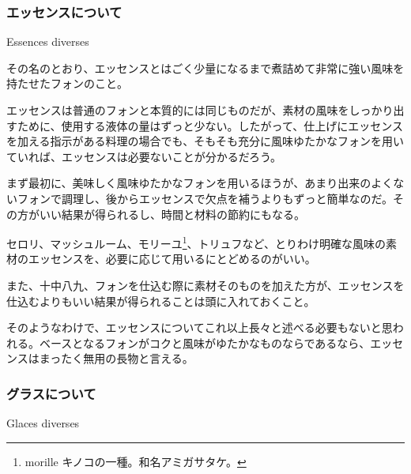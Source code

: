 \begin{recette}
\atoaki{}

\hypertarget{essences-diverses}{%
\subsubsection{エッセンスについて}\label{essences-diverses}}

\begin{frsubenv}

Essences diverses

\end{frsubenv}


その名のとおり、エッセンスとはごく少量になるまで煮詰めて非常に強い風味を持たせたフォンのこと。

エッセンスは普通のフォンと本質的には同じものだが、素材の風味をしっかり出すために、使用する液体の量はずっと少ない。したがって、仕上げにエッセンスを加える指示がある料理の場合でも、そもそも充分に風味ゆたかなフォンを用いていれば、エッセンスは必要ないことが分かるだろう。

まず最初に、美味しく風味ゆたかなフォンを用いるほうが、あまり出来のよくないフォンで調理し、後からエッセンスで欠点を補うよりもずっと簡単なのだ。その方がいい結果が得られるし、時間と材料の節約にもなる。

セロリ、マッシュルーム、モリーユ\footnote{morille
  キノコの一種。和名アミガサタケ。}、トリュフなど、とりわけ明確な風味の素材のエッセンスを、必要に応じて用いるにとどめるのがいい。

また、十中八九、フォンを仕込む際に素材そのものを加えた方が、エッセンスを仕込むよりもいい結果が得られることは頭に入れておくこと。

そのようなわけで、エッセンスについてこれ以上長々と述べる必要もないと思われる。ベースとなるフォンがコクと風味がゆたかなものならであるなら、エッセンスはまったく無用の長物と言える。

\atoaki{}

\hypertarget{glaces-diverses}{%
\subsubsection{グラスについて}\label{glaces-diverses}}

\begin{frsubenv}

Glaces diverses

\end{frsubenv}


\end{recette}
